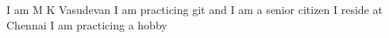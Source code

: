 I am M K Vasudevan
I am practicing git and 
I am a senior citizen
I reside at Chennai
I am practicing a hobby